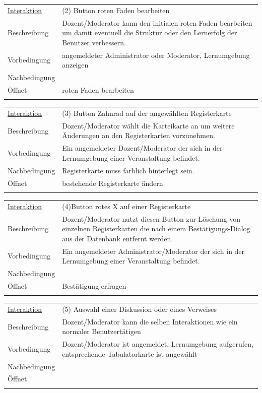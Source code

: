 \documentclass[12pt,a4paper]{article}
\begin{document}
{\begin{tabular}{l p{12cm}}
\underline{Interaktion} & (2)   Button roten Faden bearbeiten\\ 
Beschreibung   	 		& Dozent/Moderator kann den initialen roten Faden bearbeiten um damit eventuell die Struktur oder den Lernerfolg der Benutzer verbessern. \\
Vorbedingung	 		& angemeldeter Administrator oder Moderator, Lernumgebung anzeigen\\
Nachbedingung	 		& \\
Öffnet			 		& \glqq roten Faden bearbeiten\grqq \\\\
\end{tabular}

\begin{tabular}{l p{12cm}}
\underline{Interaktion} & (3) Button Zahnrad auf der angewählten Registerkarte\\ 
Beschreibung   	 		& Dozent/Moderator wählt die Karteikarte an um weitere Änderungen an den Registerkarten vorzunehmen. \\
Vorbedingung	 		& Ein angemeldeter Dozent/Moderator der sich in der Lernumgebung einer Veranstaltung befindet.\\
Nachbedingung	 		& Registerkarte muss farblich hinterlegt sein.\\
Öffnet			 		& \glqq bestehende Registerkarte ändern\grqq \\\\
\end{tabular}

\begin{tabular}{l p{12cm}}
\underline{Interaktion} & (4)Button rotes X auf einer Registerkarte  \\ 
Beschreibung   	 		& Dozent/Moderator nutzt diesen Button zur Löschung von einzelnen Registerkarten die nach einem Bestätigungs-Dialog aus der Datenbank entfernt werden. \\
Vorbedingung	 		& Ein angemeldeter Administrator/Moderator der sich in der Lernumgebung einer Veranstaltung befindet. \\
Nachbedingung	 		& \\
Öffnet			 		& \glqq Bestätigung erfragen \grqq \\\\
\end{tabular}

\begin{tabular}{l p{12cm}}
\underline{Interaktion} & (5)  Auswahl einer Diskussion oder eines Verweises \\ 
Beschreibung   	 		& Dozent/Moderator kann die selben Interaktionen wie ein \glqq normaler Benutzer\grqq tätigen \\
Vorbedingung	 		& Dozent/Moderator ist angemeldet, Lernumgebung aufgerufen, entsprechende Tabulatorkarte ist angewählt\\
Nachbedingung	 		& \\
Öffnet			 		&  \\\\
\end{tabular}

}
\end{document}
